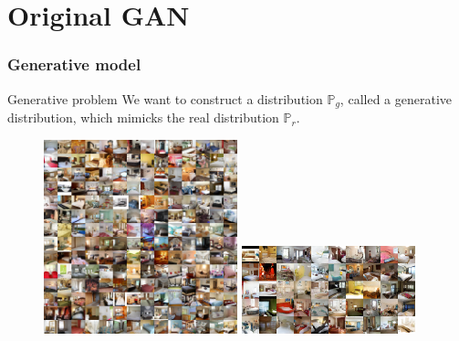 \documentclass[french,9pt]{beamer}
\begin{document}
\section{Original GAN \cite{googfellow2014}}

\begin{frame}
\frametitle{Generative model}

\begin{block}{Generative problem}
We want to construct a distribution $\mathbb{P}_{g}$, called a generative distribution, which mimicks the real distribution $\mathbb{P}_{r}$.
\end{block}

\begin{figure}
  \begin{center}
    \includegraphics[width=0.5\textwidth]{fig/lsun_bedrooms_real.png}\hspace{1mm}
     \includegraphics[width=0.45\textwidth]{fig/lsun_bedrooms_five_epoch_samples.png}\hspace{1mm}
  \end{center}
  \caption{\cite{2015arXiv151106434R}}
\end{figure}

\end{frame}
\end{document}
